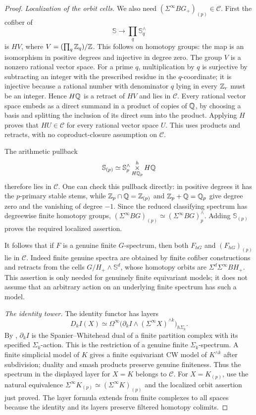 \begin{proof}
\emph{Localization of the orbit cells.}
We also need $(\Sigma^\infty BG_+)_{(p)}\in\mathcal C$.
First the cofiber of
\[
 \mathbb S\longrightarrow\prod_q\mathbb S^{\wedge}_q
\]
is $HV$, where $V=(\prod_q\mathbb Z_q)/\mathbb Z$. This follows on homotopy
groups: the map is an isomorphism in positive degrees and injective
in degree zero. The group $V$ is a nonzero rational vector space.
For a prime $q$, multiplication by $q$ is surjective by subtracting
an integer with the prescribed residue in the $q$-coordinate; it is
injective because a rational number with denominator $q$ lying in
every $\mathbb Z_r$ must be an integer. Hence $H\mathbb Q$ is a retract of $HV$
and lies in $\mathcal C$. Every rational vector space embeds as a
direct summand in a product of copies of $\mathbb Q$, by choosing a basis
and splitting the inclusion of its direct sum into the product.
Applying $H$ proves that $HU\in\mathcal C$ for every rational vector
space $U$. This uses products and retracts, with no coproduct-closure
assumption on $\mathcal C$.

The arithmetic pullback
\[
 \mathbb S_{(p)}\simeq
 \mathbb S^{\wedge}_p\mathop{\times}^{h}_{H\mathbb Q_p}H\mathbb Q
\]
therefore lies in $\mathcal C$. One can check this pullback directly:
in positive degrees it has the $p$-primary stable stems, while
$\mathbb Z_p\cap\mathbb Q=\mathbb Z_{(p)}$ and $\mathbb Z_p+\mathbb Q=\mathbb Q_p$ give degree zero
and the vanishing of degree $-1$. Since the reduced classifying
spectrum has degreewise finite homotopy groups,
$(\Sigma^\infty BG)_{(p)}\simeq(\Sigma^\infty BG)^{\wedge}_p$.
Adding $\mathbb S_{(p)}$ proves the required localized assertion.

It follows that if $F$ is a genuine finite $G$-spectrum, then both
$F_{hG}$ and $(F_{hG})_{(p)}$ lie in $\mathcal C$. Indeed finite
genuine spectra are obtained by finite cofiber constructions and
retracts from the cells $G/H_+\wedge\mathbb S^d$, whose homotopy
orbits are $\Sigma^d\Sigma^\infty BH_+$. This assertion is only
needed for genuinely finite equivariant models; it does not assume
that an arbitrary action on an underlying finite spectrum has such
a model.

\emph{The identity tower.}
The identity functor has layers
\[
 D_k I(X)\simeq
 \Omega^\infty\bigl(\partial_k I\wedge
                    (\Sigma^\infty X)^{\wedge k}\bigr)_{h\Sigma_k}.
\]
By \cite[Theorem~2.1]{EH5AroneMahowald1999}, $\partial_k I$ is the
Spanier--Whitehead dual of a finite partition complex with its
specified $\Sigma_k$-action. This is the restriction of a genuine
finite $\Sigma_k$-spectrum. A finite simplicial model of $K$ gives a
finite equivariant CW model of $K^{\wedge k}$ after subdivision;
duality and smash products preserve genuine finiteness. Thus the
spectrum in the displayed layer for $X=K$ belongs to $\mathcal C$.
For $X=K_{(p)}$, use the natural equivalence
$\Sigma^\infty K_{(p)}\simeq(\Sigma^\infty K)_{(p)}$ and the
localized orbit assertion just proved. The layer formula extends
from finite complexes to all spaces because the identity and its
layers preserve filtered homotopy colimits.


\end{proof}
